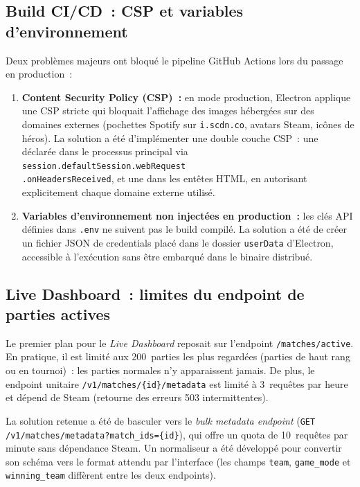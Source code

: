 \documentclass[12pt,a4paper]{article}
\begin{document}
\subsection{Build CI/CD~: CSP et variables d'environnement}

Deux problèmes majeurs ont bloqué le pipeline GitHub Actions lors du
passage en production~:

\begin{enumerate}
  \item \textbf{Content Security Policy (CSP)~:} en mode production,
    Electron applique une CSP stricte qui bloquait l'affichage des images
    hébergées sur des domaines externes (pochettes Spotify sur
    \texttt{i.scdn.co}, avatars Steam, icônes de héros). La solution
    a été d'implémenter une double couche CSP~: une déclarée dans le
    processus principal via \texttt{session.defaultSession.webRequest\\
    .onHeadersReceived}, et une dans les entêtes HTML, en autorisant
    explicitement chaque domaine externe utilisé.

  \item \textbf{Variables d'environnement non injectées en production~:}
    les clés API définies dans \texttt{.env} ne suivent pas le build
    compilé. La solution a été de créer un fichier JSON de credentials
    placé dans le dossier \texttt{userData} d'Electron, accessible à
    l'exécution sans être embarqué dans le binaire distribué.
\end{enumerate}

\subsection{Live Dashboard~: limites du endpoint de parties actives}

Le premier plan pour le \textit{Live Dashboard} reposait sur l'endpoint
\texttt{/matches/active}. En pratique, il est limité aux 200~parties les
plus regardées (parties de haut rang ou en tournoi)~: les parties normales
n'y apparaissent jamais. De plus, le endpoint unitaire
\texttt{/v1/matches/\{id\}/metadata} est limité à 3~requêtes par heure et
dépend de Steam (retourne des erreurs 503 intermittentes).

La solution retenue a été de basculer vers le
\textit{bulk metadata endpoint}
(\texttt{GET /v1/matches/metadata?match\_ids=\{id\}}), qui offre un quota
de 10~requêtes par minute sans dépendance Steam. Un normaliseur a été
développé pour convertir son schéma vers le format attendu par l'interface
(les champs \texttt{team}, \texttt{game\_mode} et \texttt{winning\_team}
diffèrent entre les deux endpoints).
\end{document}
